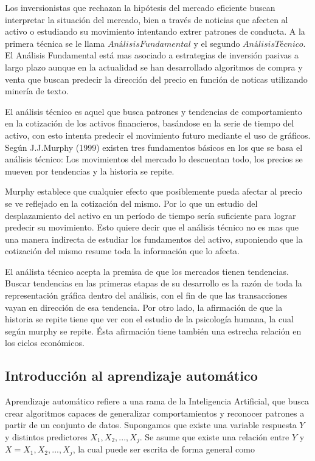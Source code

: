 \documentclass[a4paper,12pt]{Latex/Classes/PhDthesisPSnPDF}
\begin{document}
Los inversionistas que rechazan la hipótesis del mercado eficiente buscan interpretar la situación del mercado, bien a través de noticias que afecten al activo o estudiando su movimiento intentando extrer patrones de conducta. A la primera técnica se le llama $Análisis Fundamental$ y el segundo $Análisis Técnico$. El Análisis Fundamental está mas asociado a estrategias de inversión pasivas a largo plazo aunque en la actualidad se han desarrollado algoritmos de compra y venta que buscan predecir la dirección del precio en función de noticas utilizando minería de texto.

El análisis técnico es aquel que busca patrones y tendencias de comportamiento en la cotización de los activos financieros, basándose en la serie de tiempo del activo, con esto intenta predecir el movimiento futuro mediante el uso de gráficos. Según J.J.Murphy (1999) existen tres fundamentos básicos en los que se basa el análisis técnico: Los movimientos del mercado lo descuentan  todo, los precios se mueven por tendencias y la historia se repite.

Murphy establece que cualquier efecto que posiblemente pueda afectar al precio se ve reflejado en la cotización del mismo. Por lo que un estudio del desplazamiento del activo en un período de tiempo sería suficiente para lograr predecir su movimiento. Esto quiere decir que el análisis técnico no es mas que una manera indirecta de estudiar los fundamentos del activo, suponiendo que la cotización del mismo resume toda la información que lo afecta. 

El análista técnico acepta la premisa de que los mercados tienen tendencias. Buscar tendencias en las primeras etapas de su desarrollo es la razón de toda la representación gráfica dentro del análisis, con el fin de que las transacciones vayan en dirección de esa tendencia. Por otro lado, la afirmación de que la historia se repite tiene que ver con el estudio de la psicología humana, la cual según murphy se repite. Ésta afirmación tiene también una estrecha relación en los ciclos económicos. 

\subsection{Introducción al aprendizaje automático}

Aprendizaje automático refiere a una rama de la Inteligencia Artificial, que busca crear algoritmos capaces de generalizar comportamientos y reconocer patrones a partir de un conjunto de datos. Supongamos que existe una variable respuesta $Y$ y distintos predictores $X_{1}, X_{2}, ..., X_{j}$. Se asume que existe una relación entre $Y$ y $X = X_{1}, X_{2}, ..., X_{j}$, la cual puede ser escrita de forma general como
\end{document}
